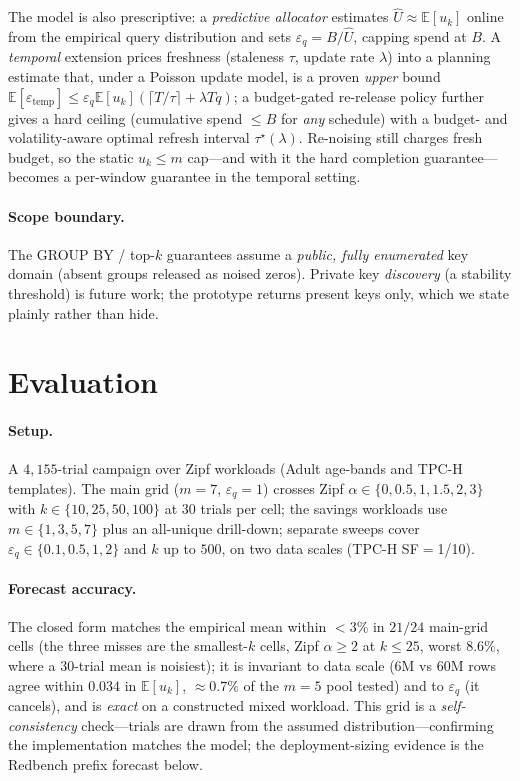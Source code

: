 \documentclass[runningheads]{llncs}
\newcommand{\eps}{\varepsilon}
\newcommand{\E}{\mathbb{E}}
\begin{document}
The model is also prescriptive: a \emph{predictive allocator} estimates $\hat U\approx\E[u_k]$ online from the empirical query distribution and sets $\eps_q=B/\hat U$, capping spend at $B$. A \emph{temporal} extension prices freshness (staleness $\tau$, update rate $\lambda$) into a planning estimate that, under a Poisson update model, is a proven \emph{upper} bound $\E[\eps_{\mathrm{temp}}]\le\eps_q\E[u_k](\lceil T/\tau\rceil+\lambda Tq)$; a budget-gated re-release policy further gives a hard ceiling (cumulative spend $\le B$ for \emph{any} schedule) with a budget- and volatility-aware optimal refresh interval $\tau^\star(\lambda)$. Re-noising still charges fresh budget, so the static $u_k\le m$ cap---and with it the hard completion guarantee---becomes a per-window guarantee in the temporal setting.

\paragraph{Scope boundary.} The GROUP BY / top-$k$ guarantees assume a \emph{public, fully enumerated} key domain (absent groups released as noised zeros). Private key \emph{discovery} (a stability threshold) is future work; the prototype returns present keys only, which we state plainly rather than hide.

\section{Evaluation}
\label{sec:eval}

\paragraph{Setup.} A $4{,}155$-trial campaign over Zipf workloads (Adult age-bands and TPC-H templates). The main grid ($m{=}7$, $\eps_q{=}1$) crosses Zipf $\alpha\in\{0,0.5,1,1.5,2,3\}$ with $k\in\{10,25,50,100\}$ at $30$ trials per cell; the savings workloads use $m\in\{1,3,5,7\}$ plus an all-unique drill-down; separate sweeps cover $\eps_q\in\{0.1,0.5,1,2\}$ and $k$ up to $500$, on two data scales (TPC-H SF$=$1/10).

\paragraph{Forecast accuracy.} The closed form matches the empirical mean within $<3\%$ in $21/24$ main-grid cells (the three misses are the smallest-$k$ cells, Zipf $\alpha{\ge}2$ at $k{\le}25$, worst $8.6\%$, where a 30-trial mean is noisiest); it is invariant to data scale (6M vs 60M rows agree within $0.034$ in $\E[u_k]$, ${\approx}0.7\%$ of the $m{=}5$ pool tested) and to $\eps_q$ (it cancels), and is \emph{exact} on a constructed mixed workload. This grid is a \emph{self-consistency} check---trials are drawn from the assumed distribution---confirming the implementation matches the model; the deployment-sizing evidence is the Redbench prefix forecast below.
\end{document}
